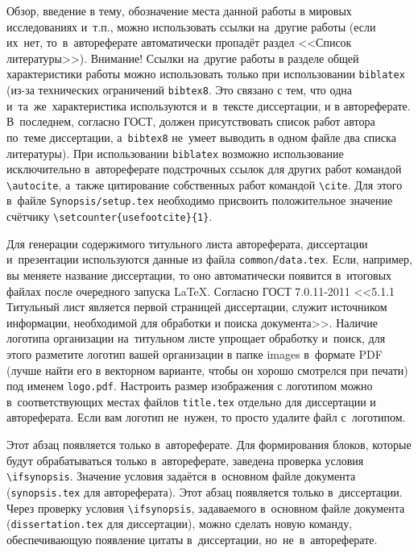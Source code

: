 
{\actuality} Обзор, введение в тему, обозначение места данной работы в
мировых исследованиях и~т.\:п., можно использовать ссылки на~другие
работы
(если их~нет, то~в~автореферате
автоматически пропадёт раздел <<Список литературы>>). Внимание! Ссылки
на~другие работы в разделе общей характеристики работы можно
использовать только при использовании \verb!biblatex! (из-за технических
ограничений \verb!bibtex8!. Это связано с тем, что одна
и~та~же~характеристика используются и~в~тексте диссертации, и в
автореферате. В~последнем, согласно ГОСТ, должен присутствовать список
работ автора по~теме диссертации, а~\verb!bibtex8! не~умеет выводить в одном
файле два списка литературы).
При использовании \verb!biblatex! возможно использование исключительно
в~автореферате подстрочных ссылок
для других работ командой \verb!\autocite!, а~также цитирование
собственных работ командой \verb!\cite!. Для этого в~файле
\verb!Synopsis/setup.tex! необходимо присвоить положительное значение
счётчику \verb!\setcounter{usefootcite}{1}!.

Для генерации содержимого титульного листа автореферата, диссертации
и~презентации используются данные из файла \verb!common/data.tex!. Если,
например, вы меняете название диссертации, то оно автоматически
появится в~итоговых файлах после очередного запуска \LaTeX. Согласно
ГОСТ 7.0.11-2011 <<5.1.1 Титульный лист является первой страницей
диссертации, служит источником информации, необходимой для обработки и
поиска документа>>. Наличие логотипа организации на~титульном листе
упрощает обработку и~поиск, для этого разметите логотип вашей
организации в папке images в~формате PDF (лучше найти его в векторном
варианте, чтобы он хорошо смотрелся при печати) под именем
\verb!logo.pdf!. Настроить размер изображения с логотипом можно
в~соответствующих местах файлов \verb!title.tex!  отдельно для
диссертации и автореферата. Если вам логотип не~нужен, то просто
удалите файл с~логотипом.

\ifsynopsis
Этот абзац появляется только в~автореферате.
Для формирования блоков, которые будут обрабатываться только в~автореферате,
заведена проверка условия \verb!\!\verb!ifsynopsis!.
Значение условия задаётся в~основном файле документа (\verb!synopsis.tex! для
автореферата).
\else
Этот абзац появляется только в~диссертации.
Через проверку условия \verb!\!\verb!ifsynopsis!, задаваемого в~основном файле
документа (\verb!dissertation.tex! для диссертации), можно сделать новую
команду, обеспечивающую появление цитаты в~диссертации, но~не~в~автореферате.
\fi

